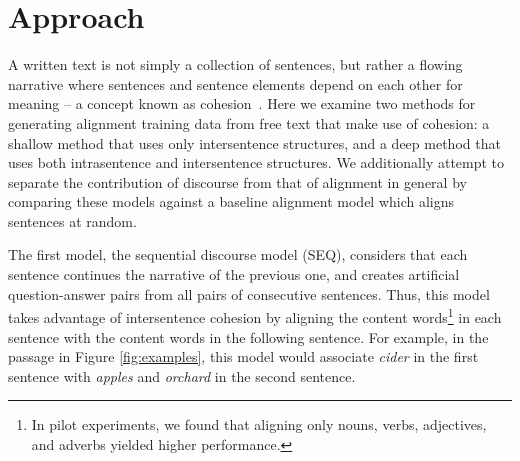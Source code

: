 \section{Approach}
\label{sec-naacl2015:approach}

A written text is not simply a collection of sentences, but rather a flowing narrative where sentences and sentence elements depend on each other for meaning -- a concept known as cohesion~\citep{halliday2014cohesion}.  
Here we examine two methods for generating alignment training data from free text that make use of cohesion: a shallow method that uses only intersentence structures, and a deep method that uses both intrasentence and intersentence structures.
We additionally attempt to separate the contribution of discourse from that of alignment in general by comparing these models against a baseline alignment model which aligns sentences at random.

The first model, the sequential discourse model (SEQ), considers that each sentence continues the narrative  of the previous one, and creates artificial question-answer pairs from all pairs of consecutive sentences.
Thus, this model takes advantage of intersentence cohesion by aligning the content words\footnote{In pilot experiments, we found that aligning only nouns, verbs, adjectives, and adverbs yielded higher performance.} in each sentence with the content words in the following sentence.  For example, in the passage in Figure \ref{fig:examples}, this model would associate \emph{cider} in the first sentence with \emph{apples} and \emph{orchard} in the second sentence.


